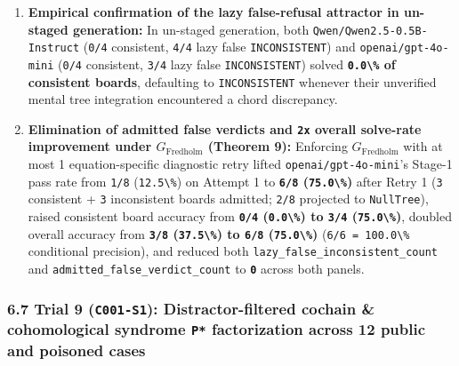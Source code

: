 \documentclass[
  11pt,
]{article}
\newcommand{\passthrough}[1]{#1}
\providecommand{\tightlist}{%
  \setlength{\itemsep}{0pt}\setlength{\parskip}{0pt}}
\begin{document}
\begin{enumerate}
\def\labelenumi{\arabic{enumi}.}
\tightlist
\item
  \textbf{Empirical confirmation of the lazy false-refusal attractor in
  un-staged generation:} In un-staged generation, both
  \nolinkurl{Qwen/Qwen2.5-0.5B-Instruct} (\passthrough{\lstinline!0/4!}
  consistent, \passthrough{\lstinline!4/4!} lazy false
  \passthrough{\lstinline!INCONSISTENT!}) and
  \nolinkurl{openai/gpt-4o-mini} (\passthrough{\lstinline!0/4!}
  consistent, \passthrough{\lstinline!3/4!} lazy false
  \passthrough{\lstinline!INCONSISTENT!}) solved
  \textbf{\passthrough{\lstinline!0.0\%!} of consistent boards},
  defaulting to \passthrough{\lstinline!INCONSISTENT!} whenever their
  unverified mental tree integration encountered a chord discrepancy.
\item
  \textbf{Elimination of admitted false verdicts and
  \passthrough{\lstinline!2x!} overall solve-rate improvement under
  \(G_{\text{Fredholm}}\) (Theorem 9):} Enforcing
  \(G_{\text{Fredholm}}\) with at most 1 equation-specific diagnostic
  retry lifted \nolinkurl{openai/gpt-4o-mini}'s Stage-1 pass rate from
  \passthrough{\lstinline!1/8!} (\passthrough{\lstinline!12.5\%!}) on
  Attempt 1 to \textbf{\passthrough{\lstinline!6/8!}
  (\passthrough{\lstinline!75.0\%!})} after Retry 1
  (\passthrough{\lstinline!3!} consistent + \passthrough{\lstinline!3!}
  inconsistent boards admitted; \passthrough{\lstinline!2/8!} projected
  to \passthrough{\lstinline!NullTree!}), raised consistent board
  accuracy from \textbf{\passthrough{\lstinline!0/4!}
  (\passthrough{\lstinline!0.0\%!}) to \passthrough{\lstinline!3/4!}
  (\passthrough{\lstinline!75.0\%!})}, doubled overall accuracy from
  \textbf{\passthrough{\lstinline!3/8!}
  (\passthrough{\lstinline!37.5\%!}) to \passthrough{\lstinline!6/8!}
  (\passthrough{\lstinline!75.0\%!})}
  (\passthrough{\lstinline!6/6 = 100.0\%!} conditional precision), and
  reduced both \nolinkurl{lazy_false_inconsistent_count} and
  \nolinkurl{admitted_false_verdict_count} to
  \textbf{\passthrough{\lstinline!0!}} across both panels.
\end{enumerate}

\subsubsection{\texorpdfstring{6.7 Trial 9 (\texttt{C001-S1}):
Distractor-filtered cochain \& cohomological syndrome \texttt{P*}
factorization across 12 public and poisoned
cases}{6.7 Trial 9 (C001-S1): Distractor-filtered cochain \& cohomological syndrome P* factorization across 12 public and poisoned cases}}\label{trial-9-c001-s1-distractor-filtered-cochain-cohomological-syndrome-p-factorization-across-12-public-and-poisoned-cases}
\end{document}
